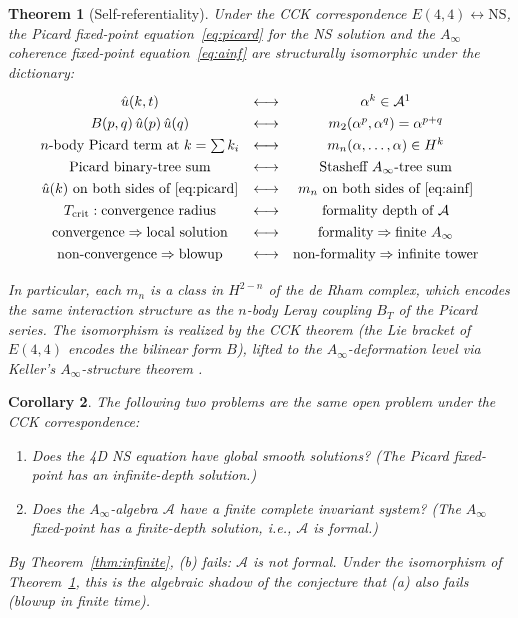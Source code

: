 \documentclass[reqno,10pt]{amsart}
\theoremstyle{plain}
\newtheorem{theorem}{Theorem}[section]
\newtheorem{corollary}[theorem]{Corollary}
\theoremstyle{definition}
\def\gE{E(4,4)}
\begin{document}
\begin{theorem}[Self-referentiality]\label{thm:selfref}
  Under the CCK correspondence $\gE \leftrightarrow \mathrm{NS}$, the
  Picard fixed-point equation~\eqref{eq:picard} for the NS solution and
  the $A_\infty$ coherence fixed-point equation~\eqref{eq:ainf} are
  structurally isomorphic under the dictionary:
  \[
  \renewcommand{\arraystretch}{1.3}
  \begin{array}{c@{\quad\longleftrightarrow\quad}c}
    \hat{u}(k,t) & \alpha^k \in \mathcal{A}^1 \\
    B(p,q)\,\hat{u}(p)\,\hat{u}(q) & m_2(\alpha^p,\alpha^q) = \alpha^{p+q} \\
    n\text{-body Picard term at }k=\sum k_i & m_n(\alpha,\ldots,\alpha)\in H^k \\
    \text{Picard binary-tree sum} & \text{Stasheff }A_\infty\text{-tree sum} \\
    \hat{u}(k)\text{ on both sides of \eqref{eq:picard}} & m_n\text{ on both sides of \eqref{eq:ainf}} \\
    T_{\mathrm{crit}}: \text{convergence radius} & \text{formality depth of }\mathcal{A} \\
    \text{convergence} \Rightarrow \text{local solution} & \text{formality} \Rightarrow \text{finite }A_\infty \\
    \text{non-convergence} \Rightarrow \text{blowup} & \text{non-formality} \Rightarrow \text{infinite tower}
  \end{array}
  \]

  In particular, each $m_n$ is a class in $H^{2-n}$ of the de Rham complex,
  which encodes the same interaction structure as the $n$-body Leray coupling
  $B_T$ of the Picard series.  The isomorphism is realized by the CCK theorem
  (the Lie bracket of $\gE$ encodes the bilinear form $B$), lifted to the
  $A_\infty$-deformation level via Keller's $A_\infty$-structure theorem
  \cite{Keller2001}.
\end{theorem}

\begin{corollary}\label{cor:same}
  The following two problems are the same open problem under the CCK
  correspondence:
  \begin{enumerate}
    \item[\rm(a)] Does the 4D NS equation have global smooth solutions?
          (The Picard fixed-point has an infinite-depth solution.)
    \item[\rm(b)] Does the $A_\infty$-algebra $\mathcal{A}$ have a finite
          complete invariant system?
          (The $A_\infty$ fixed-point has a finite-depth solution, i.e., $\mathcal{A}$ is formal.)
  \end{enumerate}
  By Theorem~\ref{thm:infinite}, (b) fails: $\mathcal{A}$ is not formal.
  Under the isomorphism of Theorem~\ref{thm:selfref}, this is the algebraic
  shadow of the conjecture that (a) also fails (blowup in finite time).
\end{corollary}
\end{document}
